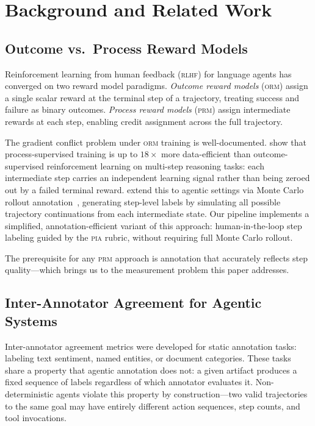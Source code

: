\documentclass{article}
\newcommand{\PIA}{\textsc{pia}}          %
\begin{document}
\section{Background and Related Work}
\label{sec:background}

\subsection{Outcome vs.\ Process Reward Models}
\label{sec:background:prm}

Reinforcement learning from human feedback (\textsc{rlhf}) for language
agents has converged on two reward model paradigms.
%
\emph{Outcome reward models} (\textsc{orm}) assign a single scalar reward
at the terminal step of a trajectory, treating success and failure as
binary outcomes.
%
\emph{Process reward models} (\textsc{prm}) assign intermediate rewards
at each step, enabling credit assignment across the full trajectory.

The gradient conflict problem under \textsc{orm} training is well-documented.
%
\citet{reasonrag2025} show that process-supervised training is up to $18\times$
more data-efficient than outcome-supervised reinforcement learning on
multi-step reasoning tasks: each intermediate step carries an independent
learning signal rather than being zeroed out by a failed terminal reward.
%
\citet{agentprm2025} extend this to agentic settings via Monte Carlo
rollout annotation~\cite{agentprm2025}, generating step-level labels by
simulating all possible trajectory continuations from each intermediate state.
%
Our pipeline implements a simplified, annotation-efficient variant of this
approach: human-in-the-loop step labeling guided by the \PIA{} rubric,
without requiring full Monte Carlo rollout.

The prerequisite for any \textsc{prm} approach is annotation that accurately
reflects step quality---which brings us to the measurement problem this paper
addresses.

\subsection{Inter-Annotator Agreement for Agentic Systems}
\label{sec:background:iaa}

Inter-annotator agreement metrics were developed for static annotation tasks:
labeling text sentiment, named entities, or document categories.
%
These tasks share a property that agentic annotation does not: a given
artifact produces a fixed sequence of labels regardless of which annotator
evaluates it.
%
Non-deterministic agents violate this property by construction---two valid
trajectories to the same goal may have entirely different action sequences,
step counts, and tool invocations.
\end{document}
